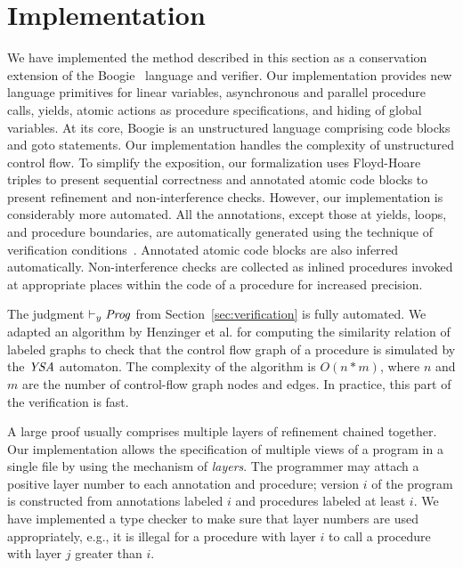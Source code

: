 \section{Implementation}
\label{sec:implementation}

We have implemented the method described in this section as a conservation extension 
of the Boogie~\cite{BarnettCDJL05} language and verifier.
Our implementation provides new language primitives for linear variables, asynchronous and parallel procedure calls, 
yields, atomic actions as procedure specifications, and hiding of global variables.
At its core, Boogie is an unstructured language comprising code blocks and goto statements.
Our implementation handles the complexity of unstructured control flow.
To simplify the exposition, our formalization uses Floyd-Hoare triples to present sequential correctness and 
annotated atomic code blocks to present refinement and non-interference checks.
However, our implementation is considerably more automated.  
All the annotations, except those at yields, loops, and procedure boundaries, are automatically generated 
using the technique of verification conditions~\cite{BL05}.
Annotated atomic code blocks are also inferred automatically.
Non-interference checks are collected as inlined procedures
invoked at appropriate places within the code of a procedure for increased precision.

The judgment $\vdash_y \mathit{Prog}$ from Section~\ref{sec:verification} is fully automated.
We adapted an algorithm by Henzinger et al.\cite{HenzingerHK95} for computing the similarity relation of 
labeled graphs to check that the control flow graph of a procedure is simulated by
the $\mathit{YSA}$ automaton.
The complexity of the algorithm is $O(n*m)$, where $n$ and $m$ are the number of control-flow graph nodes and edges.
In practice, this part of the verification is fast.

A large proof usually comprises multiple layers of refinement chained together.
Our implementation allows the specification of multiple views of a program in a single file by using the mechanism of {\em layers}.
The programmer may attach a positive layer number to each annotation and procedure; 
version $i$ of the program is constructed from annotations labeled $i$ and procedures labeled at least $i$.
We have implemented a type checker to make sure that layer numbers are used appropriately, e.g., 
it is illegal for a procedure with layer $i$ to call a procedure with layer $j$ greater than $i$.
